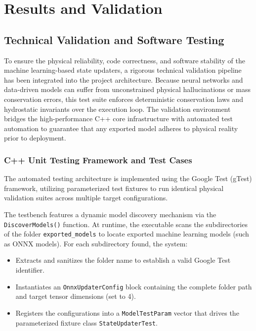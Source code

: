 \chapter{Results and Validation}
\label{chapter:results_and_validation}


\section{Technical Validation and Software Testing}

To ensure the physical reliability, code correctness, and software stability of the machine learning-based state updaters, a rigorous 
technical validation pipeline has been integrated into the project architecture. Because neural networks and data-driven models can suffer 
from unconstrained physical hallucinations or mass conservation errors, this test suite enforces deterministic conservation laws and 
hydrostatic invariants over the execution loop. The validation environment bridges the high-performance C++ core infrastructure with 
automated test automation to guarantee that any exported model adheres to physical reality prior to deployment.

\subsection{C++ Unit Testing Framework and Test Cases}

The automated testing architecture is implemented using the Google Test (gTest) framework, utilizing parameterized test fixtures to run 
identical physical validation suites across multiple target configurations. 

The testbench features a dynamic model discovery mechanism via the \\ \texttt{DiscoverModels()} function. At runtime, the executable scans the 
subdirectories of the folder \texttt{exported\_models} to locate exported machine learning models (such as ONNX 
models). For each subdirectory found, the system:

\begin{itemize}
    \item Extracts and sanitizes the folder name to establish a valid Google Test identifier.
    \item Instantiates an \texttt{OnnxUpdaterConfig} block containing the complete folder path and target tensor dimensions (set to 4).
    \item Registers the configurations into a \texttt{ModelTestParam} vector that drives the parameterized fixture class 
    \texttt{StateUpdaterTest}.
\end{itemize}

